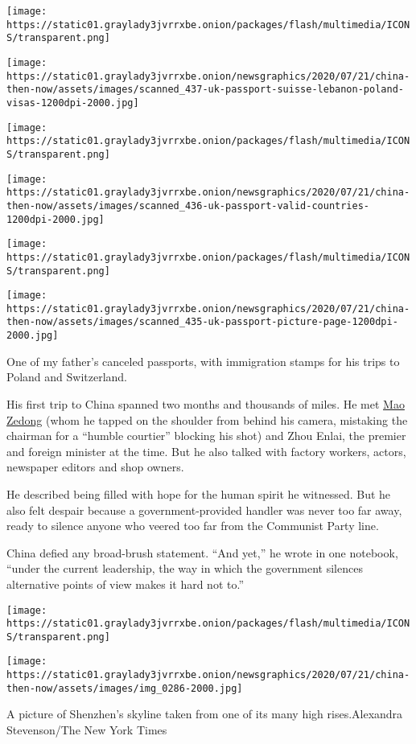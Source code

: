 \texttt{[image: https://static01.graylady3jvrrxbe.onion/packages/flash/multimedia/ICONS/transparent.png]}

\texttt{[image: https://static01.graylady3jvrrxbe.onion/newsgraphics/2020/07/21/china-then-now/assets/images/scanned\_437-uk-passport-suisse-lebanon-poland-visas-1200dpi-2000.jpg]}

\texttt{[image: https://static01.graylady3jvrrxbe.onion/packages/flash/multimedia/ICONS/transparent.png]}

\texttt{[image: https://static01.graylady3jvrrxbe.onion/newsgraphics/2020/07/21/china-then-now/assets/images/scanned\_436-uk-passport-valid-countries-1200dpi-2000.jpg]}

\texttt{[image: https://static01.graylady3jvrrxbe.onion/packages/flash/multimedia/ICONS/transparent.png]}

\texttt{[image: https://static01.graylady3jvrrxbe.onion/newsgraphics/2020/07/21/china-then-now/assets/images/scanned\_435-uk-passport-picture-page-1200dpi-2000.jpg]}

One of my father's canceled passports, with immigration stamps for his
trips to Poland and Switzerland.

His first trip to China spanned two months and thousands of miles. He
met
\href{https://archive.nytimes3xbfgragh.onion/www.nytimes3xbfgragh.onion/library/world/asia/061357mao-inthenews.html}{Mao
Zedong} (whom he tapped on the shoulder from behind his camera,
mistaking the chairman for a ``humble courtier'' blocking his shot) and
Zhou Enlai, the premier and foreign minister at the time. But he also
talked with factory workers, actors, newspaper editors and shop owners.

He described being filled with hope for the human spirit he witnessed.
But he also felt despair because a government-provided handler was never
too far away, ready to silence anyone who veered too far from the
Communist Party line.

China defied any broad-brush statement. ``And yet,'' he wrote in one
notebook, ``under the current leadership, the way in which the
government silences alternative points of view makes it hard not to.''

\texttt{[image: https://static01.graylady3jvrrxbe.onion/packages/flash/multimedia/ICONS/transparent.png]}

\texttt{[image: https://static01.graylady3jvrrxbe.onion/newsgraphics/2020/07/21/china-then-now/assets/images/img\_0286-2000.jpg]}

A picture of Shenzhen's skyline taken from one of its many high
rises.Alexandra Stevenson/The New York Times

